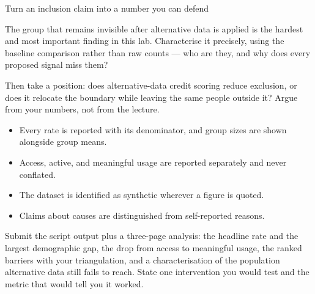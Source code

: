 \begin{labproject}{Turn an inclusion claim into a number you can defend}
\begin{tryit}
The group that remains invisible after alternative data is applied is the hardest and most important finding in this lab. Characterise it precisely, using the baseline comparison rather than raw counts --- who are they, and why does every proposed signal miss them?

Then take a position: does alternative-data credit scoring reduce exclusion, or does it relocate the boundary while leaving the same people outside it? Argue from your numbers, not from the lecture.
\end{tryit}
\end{labproject}

\begin{verification}
\begin{itemize}
  \item Every rate is reported with its denominator, and group sizes are shown alongside group means.
  \item Access, active, and meaningful usage are reported separately and never conflated.
  \item The dataset is identified as synthetic wherever a figure is quoted.
  \item Claims about causes are distinguished from self-reported reasons.
\end{itemize}
\end{verification}

\begin{labdeliverable}
Submit the script output plus a three-page analysis: the headline rate and the largest demographic gap, the drop from access to meaningful usage, the ranked barriers with your triangulation, and a characterisation of the population alternative data still fails to reach. State one intervention you would test and the metric that would tell you it worked.
\end{labdeliverable}

